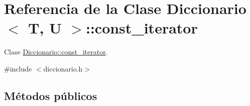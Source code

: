 \hypertarget{classDiccionario_1_1const__iterator}{}\section{Referencia de la Clase Diccionario$<$ T, U $>$\+:\+:const\+\_\+iterator}
\label{classDiccionario_1_1const__iterator}


Clase \hyperlink{classDiccionario_1_1const__iterator}{Diccionario\+::const\+\_\+iterator}.  




{\ttfamily \#include $<$diccionario.\+h$>$}

\subsection*{Métodos públicos}
